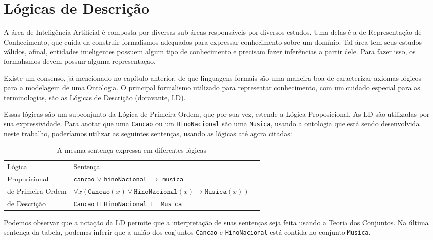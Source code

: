 \chapter{Lógicas de Descrição}

\lettrine{A}{} área de Inteligência Artificial é composta por diversas sub-áreas responsáveis por diversos estudos. Uma delas é a de Representação de Conhecimento, que cuida da construir formalismos adequados para expressar conhecimento sobre um domínio. Tal área tem seus estudos válidos, afinal, entidades inteligentes possuem algum tipo de conhecimento e precisam fazer inferências a partir dele. Para fazer isso, os formalismos devem possuir alguma representação.

Existe um consenso, já mencionado no capítulo anterior, de que linguagens formais são uma maneira boa de caracterizar axiomas lógicos para a modelagem de uma Ontologia. O principal formalismo utilizado para representar conhecimento, com um cuidado especial para as terminologias, são as Lógicas de Descrição (doravante, LD).

Essas lógicas são um subconjunto da Lógica de Primeira Ordem, que por sua vez, estende a Lógica Proposicional. As LD são utilizadas por sua expressividade. Para anotar que uma \texttt{Cancao} ou um \texttt{HinoNacional} são uma \texttt{Musica}, usando a ontologia que está sendo desenvolvida neste trabalho, poderíamos utilizar as seguintes sentenças, usando as lógicas até agora citadas:

\begin{table}[H]
	\centering
	\begin{tabular}{|l|l|l}
		\cline{1-2}
		Lógica                   & Sentença & \\ \cline{1-2}
		Proposicional     & \texttt{cancao} $\lor$ \texttt{hinoNacional} $\to$ \texttt{musica} & \\ \cline{1-2}
		de Primeira Ordem & $\forall x(\texttt{Cancao}(x) \lor \texttt{HinoNacional}(x) \to \texttt{Musica}(x))$         & \\ \cline{1-2}
		de Descrição      & \texttt{Cancao} $\sqcup$ \texttt{HinoNacional} $\sqsubseteq$ \texttt{Musica}  & \\ \cline{1-2}
	\end{tabular}
\caption{A mesma sentença expressa em diferentes lógicas}
\end{table}

Podemos observar que a notação da LD permite que a interpretação de suas sentenças seja feita usando a Teoria dos Conjuntos. Na última sentença da tabela, podemos inferir que a união dos conjuntos \texttt{Cancao} e \texttt{HinoNacional} está contida no conjunto \texttt{Musica}.


